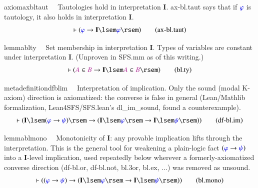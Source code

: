 \begin{restatable}{axiom}{axbltaut}~~ Tautologies hold in interpretation
$\mathbf{I}$.
   ax-bl.taut says that if $\mw{\varphi}$ is tautology, it also holds in
interpretation $\mathbf{I}$.
\begin{align}
\vdash ( \mw{\varphi} \rightarrow \mathbf{I} \lsem \mw{\varphi} \rsem
    )\label{eq:ax-bl.taut}\tag{ax-bl.taut}
\end{align}
\end{restatable}

\begin{restatable}{lemma}{blty}~~ Set membership in interpretation $\mathbf{I}$.
Types of variables are constant under interpretation $\mathbf{I}$.  (Unproven
in SFS.mm as of this writing.)
\begin{align}
\vdash ( \mc{A} \in \mc{B} \rightarrow \mathbf{I} \lsem \mc{A} \in \mc{B}
    \rsem )\label{eq:bl.ty}\tag{bl.ty}
\end{align}
\end{restatable}

\begin{restatable}{metadefinition}{dfblim}~~ Interpretation of implication.  Only
the sound (modal K-axiom) direction is axiomatized: the converse is false
in general (Lean/Mathlib formalization, Lean4SFS/SFS.lean's dl\_im\_sound,
found a counterexample).
\begin{align}
\vdash ( \mathbf{I} \lsem ( \mw{\varphi} \rightarrow \mw{\psi} ) \rsem
    \rightarrow ( \mathbf{I} \lsem \mw{\varphi} \rsem \rightarrow \mathbf{I}
    \lsem \mw{\psi} \rsem ) )\label{eq:df-bl.im}\tag{df-bl.im}
\end{align}
\end{restatable}

\begin{restatable}{lemma}{blmono}~~ Monotonicity of $\mathbf{I}$: any provable
implication lifts through the interpretation.  This is the general tool for
weakening a plain-logic fact $( \mw{\varphi} \rightarrow \mw{\psi} )$ into a
$\mathbf{I}$-level implication, used repeatedly below wherever a
formerly-axiomatized converse direction (df-bl.or, df-bl.not, bl.3or,
bl.ex, ...) was removed as unsound.
\begin{align}
\vdash ( ( \mw{\varphi} \rightarrow \mw{\psi} ) \rightarrow ( \mathbf{I} \lsem
    \mw{\varphi} \rsem \rightarrow \mathbf{I} \lsem \mw{\psi} \rsem )
    )\label{eq:bl.mono}\tag{bl.mono}
\end{align}
\end{restatable}

